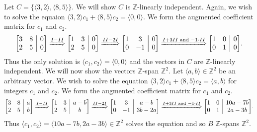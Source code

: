 \documentclass[12pt]{article}
\makeatletter
\newenvironment{amatrix}[1]{%
            \left[\begin{array}{@{}*{#1}{c}|c@{}}
        }{%
            \end{array}\right]
        }
\newcommand{\Z}{\mathbb{Z}}
\newenvironment{exercise}[2][Exercise]{\begin{trivlist}
        \item[\hskip \labelsep {\bfseries #1}\hskip \labelsep {\bfseries #2.}]}{\end{trivlist}}
\makeatother
\begin{document}
\begin{exercise}{38}
\begin{enumerate}[label=(\alph*)]
            Let \( C = \{ \langle 3,2 \rangle , \langle 8,5 \rangle \} . \) We will show \( C \) is \( \Z \)-linearly independent. Again, we wish to solve the equaion \( \langle 3,2 \rangle c_{1} + \langle 8,5 \rangle c_{2} = \langle 0,0 \rangle .\) We form the augmented coefficient matrix for \( c_{1} \) and \( c_{2} . \)
            $$ \begin{amatrix}{2}
                3 & 8 & 0\\
                2 & 5 & 0
            \end{amatrix} \xRightarrow{I-II}
            \begin{amatrix}{2}
                1 & 3 & 0\\
                2 & 5 & 0
            \end{amatrix} \xRightarrow{II-2I}
            \begin{amatrix}{2}
                1 & 3 & 0\\
                0 & -1 & 0
            \end{amatrix} \xRightarrow{I + 3II \text{ and } -1\cdot II}
            \begin{amatrix}{2}
                1 & 0 & 0\\
                0 & 1 & 0
            \end{amatrix}.$$
            Thus the only solution is \( \langle c_{1} , c_{2} \rangle = \langle 0,0 \rangle  \) and the vectors in \( C \) are \( \Z \)-linearly independent. We will now show the vectors \( \Z \)-span \( \Z^{2} . \) Let \( \langle a,b \rangle \in \Z^{2} \) be an arbitrary vector. We wish to solve the equation \( \langle 3,2 \rangle c_{1} + \langle 8,5 \rangle c_{2} = \langle a,b \rangle \) for integers \( c_{1} \) and \( c_{2} . \) We form the augmented coefficient matrix for \( c_{1} \) and \( c_{2} . \)
            $$ \begin{amatrix}{2}
                3 & 8 & a\\
                2 & 5 & b
            \end{amatrix} \xRightarrow{I-II}
            \begin{amatrix}{2}
                1 & 3 & a-b\\
                2 & 5 & b
            \end{amatrix} \xRightarrow{II-2I}
            \begin{amatrix}{2}
                1 & 3 & a-b\\
                0 & -1 & 3b-2a
            \end{amatrix} \xRightarrow{I + 3II \text{ and } -1\cdot II}
            \begin{amatrix}{2}
                1 & 0 & 10a - 7b\\
                0 & 1 & 2a-3b
            \end{amatrix}.$$
            Thus \( \langle c_{1} , c_{2} \rangle = \langle 10a-7b, 2a-3b \rangle \in \Z^{2} \) solves the equation and so \( B \) \( \Z \)-spans \( \Z^{2} . \)


\end{enumerate}
\end{exercise}
\end{document}

